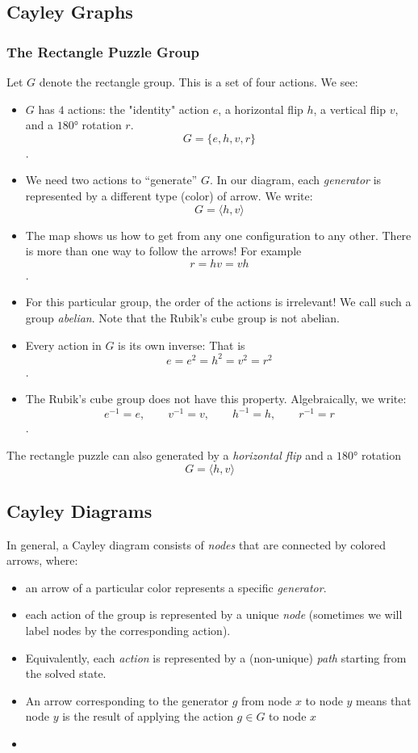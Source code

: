 \documentclass{article}
\begin{document}
\subsection{Cayley Graphs}
\subsubsection{The Rectangle Puzzle Group}
Let $G$ denote the rectangle group. This is a set of four actions. We see:
\begin{itemize}
    \item $G$ has $4$ actions: the "identity" action $e$, a horizontal flip $h$,
    a vertical flip $v$, and a $\ang{180}$ rotation $r$.
    \[G = \{e,h,v,r\}\].
    \item We need two actions to “generate” $G$. In our diagram, each
    \emph{generator} is represented by a different type (color) of arrow. We
    write:
    \[G = \langle h,v\rangle\]
    \item The map shows us how to get from any one configuration to any other.
    There is more than one way to follow the arrows! For example
    \[r = hv= vh\].
    \item For this particular group, the order of the actions is irrelevant! We
    call such a group \emph{abelian}. Note that the Rubik’s cube group is not abelian.
    \item Every action in $G$ is its own inverse: That is
    \[e=e^2=h^2=v^2=r^2\].
    \item The Rubik’s cube group does not have this property. Algebraically, we
    write:
    \[e^{-1}=e, \qquad v^{-1}=v, \qquad h^{-1}=h, \qquad r^{-1}=r\].
\end{itemize}
The rectangle puzzle can also generated by a \emph{horizontal flip} and a $\ang{180}$
rotation
\[G = \langle h,v\rangle\]

\subsection{Cayley Diagrams}
In general, a Cayley diagram consists of \emph{nodes} that are connected by
colored arrows, where:
\begin{itemize}
     \item an arrow of a particular color  represents a specific \emph{generator}.
     \item each action of the group is represented by a unique \emph{node} (sometimes
     we will label nodes by the corresponding action).
     \item Equivalently, each \emph{action} is represented by a (non-unique) \emph{path} starting from the
     solved state.
     \item An arrow corresponding to the generator $g$ from node $x$ to node $y$
     means that node $y$ is the result of applying the action $g \in G$ to node
     $x$
     \item 
\end{itemize}
\end{document}
